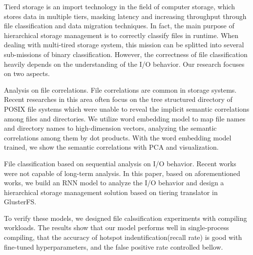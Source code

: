 \begin{eabstract}
Tierd storage is an import technology in the field of computer storage, which stores data in multiple tiers, masking latency and increasing throughput through file classification and data migration techniques. In fact, the main purpose of hierarchical storage management is to correctly classify files in runtime. When dealing with multi-tired storage system, this mission can be splitted into several sub-missions of binary classification. However, the correctness of file classification heavily depends on the understanding of the I/O behavior. Our research focuses on two aspects.


Analysis on file correlations. File correlations are common in storage systems. Recent researches in this area often focus on the tree structured directory of POSIX file systems which were unable to reveal the implicit semantic correlations among files and directories. We utilize word embedding model to map file names and directory names to high-dimension vectors, analyzing the semantic correlations among them by dot products. With the word embedding model trained, we show the semantic correlations with PCA and visualization.


File classification based on sequential analysis on I/O behavior. Recent works were not capable of long-term analysis. In this paper, based on aforementioned works, we build an RNN model to analyze the I/O behavior and design a hierarchical storage management solution based on tiering translator in GlusterFS.

To verify these models, we designed file calssification experiments with compiling workloads. The results show that our model performs well in single-process compiling, that the accuracy of hotspot indentification(recall rate) is good with fine-tuned hyperparameters, and the false positive rate controlled bellow.
\end{eabstract}

